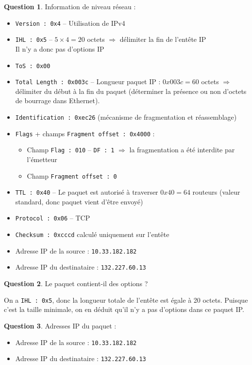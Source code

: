 \documentclass[11pt,english,french]{scrreprt}
\theoremstyle{remark}
\theoremstyle{definition}
\newtheorem{ques}{Question}[section]
\begin{document}
\begin{ques}
	Information de niveau réseau :\begin{itemize}
		\item \lstinline!Version : 0x4! -- Utilisation de IPv4
		\item \lstinline!IHL : 0x5! -- $5 \times 4 = 20$ octets $\Rightarrow$ délimiter la fin de l'entête IP\\
		Il n'y a donc pas d'options IP
		\item \lstinline!ToS : 0x00!
		\item \lstinline!Total Length : 0x003c! -- Longueur paquet IP : $0x003c=60$ octets $\Rightarrow$ délimiter du début à la  fin du paquet (déterminer la présence ou non d'octets de bourrage dans Ethernet).
		\item \lstinline!Identification : 0xec26! (mécanisme de fragmentation et réassemblage)
		\item \lstinline!Flags! + champs \lstinline!Fragment offset : 0x4000! :\begin{itemize}
			\item Champ \lstinline!Flag : 010! -- \lstinline!DF : 1! $\Rightarrow$ la fragmentation a été interdite par l'émetteur
			\item Champ \lstinline!Fragment offset : 0!
		\end{itemize}
		\item \lstinline!TTL : 0x40! -- Le paquet est autorisé à traverser $0x40 = 64$ routeurs (valeur standard, donc paquet vient d'être envoyé)
		\item \lstinline!Protocol : 0x06! -- TCP 
		\item \lstinline!Checksum : 0xcccd! calculé uniquement sur l'entête
		\item Adresse IP de la source : \lstinline!10.33.182.182!
		\item Adresse IP du destinataire : \lstinline!132.227.60.13!
	\end{itemize}
\end{ques}

\begin{ques}
	Le paquet contient-il des options ?
	
	On a \lstinline!IHL : 0x5!, donc la longueur totale de l'entête est égale à 20 octets. Puisque c'est la taille minimale, on en déduit qu'il n'y a  pas d'options dans ce paquet IP.
\end{ques}

\begin{ques}
	Adresses IP du paquet :\begin{itemize}
		\item Adresse IP de la source : \lstinline!10.33.182.182!
		\item Adresse IP du destinataire : \lstinline!132.227.60.13!
	\end{itemize}
\end{ques}
\end{document}
